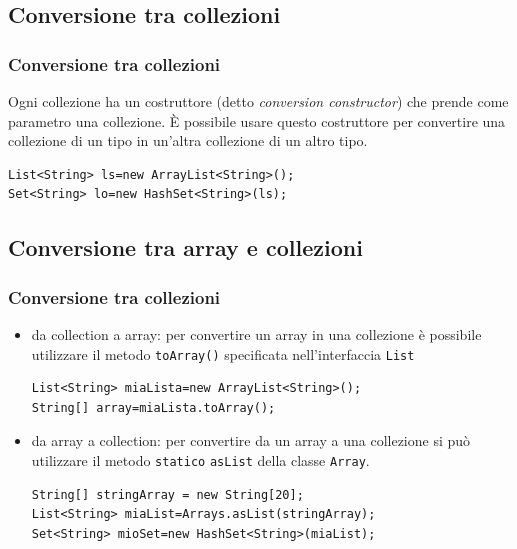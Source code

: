 \documentclass{beamer}
\begin{document}
\subsection{Conversione tra collezioni}
\begin{frame}[fragile]
\frametitle{Conversione tra collezioni}
Ogni collezione ha un costruttore (detto \emph{conversion constructor}) che prende come parametro una collezione. \`E possibile usare questo costruttore per convertire una collezione di un tipo in un'altra collezione di un altro tipo.
\begin{lstlisting}
List<String> ls=new ArrayList<String>();
Set<String> lo=new HashSet<String>(ls);
\end{lstlisting}
\end{frame}

\subsection{Conversione tra array e collezioni}
\begin{frame}[fragile]
\frametitle{Conversione tra collezioni}
\begin{itemize}
\item da collection a array: per convertire un array in una collezione \`e possibile utilizzare il metodo \texttt{toArray()} specificata nell'interfaccia \texttt{List}
\begin{lstlisting}
List<String> miaLista=new ArrayList<String>();
String[] array=miaLista.toArray();
\end{lstlisting}
\end{itemize}
\begin{itemize}
\item da array a collection: per convertire da un array a una collezione si pu\`o utilizzare il metodo \texttt{statico} \texttt{asList} della classe \texttt{Array}.
\begin{lstlisting}
String[] stringArray = new String[20];
List<String> miaList=Arrays.asList(stringArray);
Set<String> mioSet=new HashSet<String>(miaList);
\end{lstlisting}
\end{itemize}
\end{frame}
\end{document}
